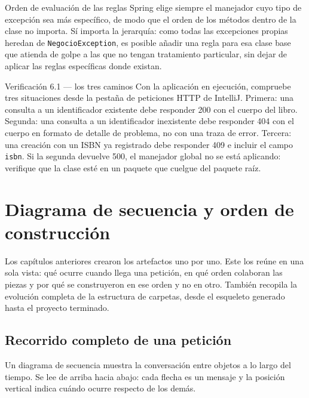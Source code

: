 \documentclass[11pt,a4paper,openany]{book}
\begin{document}
\begin{cajabuenas}{Orden de evaluación de las reglas}
	Spring elige siempre el manejador cuyo tipo de excepción sea más específico, de modo que el orden de los métodos dentro de la clase no importa. Sí importa la jerarquía: como todas las excepciones propias heredan de \texttt{NegocioException}, es posible añadir una regla para esa clase base que atienda de golpe a las que no tengan tratamiento particular, sin dejar de aplicar las reglas específicas donde existan.
\end{cajabuenas}

\begin{cajaejercicio}{Verificación 6.1 --- los tres caminos}
	Con la aplicación en ejecución, compruebe tres situaciones desde la pestaña de peticiones HTTP de IntelliJ. Primera: una consulta a un identificador existente debe responder 200 con el cuerpo del libro. Segunda: una consulta a un identificador inexistente debe responder 404 con el cuerpo en formato de detalle de problema, no con una traza de error. Tercera: una creación con un ISBN ya registrado debe responder 409 e incluir el campo \texttt{isbn}. Si la segunda devuelve 500, el manejador global no se está aplicando: verifique que la clase esté en un paquete que cuelgue del paquete raíz.
\end{cajaejercicio}

\chapter{Diagrama de secuencia y orden de construcción}
\label{cap:secuencia}

Los capítulos anteriores crearon los artefactos uno por uno. Este los reúne en una sola vista: qué ocurre cuando llega una petición, en qué orden colaboran las piezas y por qué se construyeron en ese orden y no en otro. También recopila la evolución completa de la estructura de carpetas, desde el esqueleto generado hasta el proyecto terminado.

\section{Recorrido completo de una petición}
\label{sec:recorrido}

Un diagrama de secuencia muestra la conversación entre objetos a lo largo del tiempo. Se lee de arriba hacia abajo: cada flecha es un mensaje y la posición vertical indica cuándo ocurre respecto de los demás.
\end{document}
